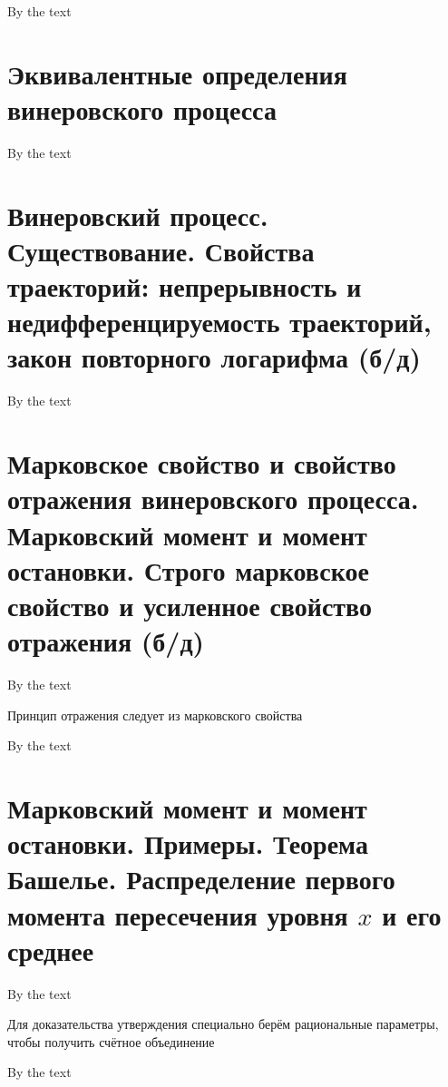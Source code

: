 \documentclass[a4paper, 14pt]{article}
\begin{document}
    By the text
    
    \section{Эквивалентные определения винеровского процесса}
    
    By the text
    
    \section{Винеровский процесс.
    Существование.
    Свойства траекторий: непрерывность и недифференцируемость траекторий, закон повторного логарифма (б/д)}
    
    By the text
    
    \section{Марковское свойство и свойство отражения винеровского процесса.
    Марковский момент и момент остановки.
    Строго марковское свойство и усиленное свойство отражения (б/д)}
    
    By the text
    
    Принцип отражения следует из марковского свойства
    
    By the text
    
    \section{Марковский момент и момент остановки.
    Примеры.
    Теорема Башелье.
    Распределение первого момента пересечения уровня $x$ и его среднее}
    
    By the text
    
    Для доказательства утверждения специально берём рациональные параметры, чтобы получить счётное объединение
    
    By the text
    
\end{document}
